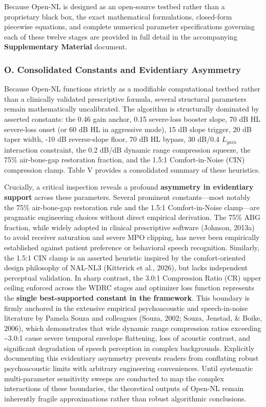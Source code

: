 \documentclass[
  12pt,
]{article}
\begin{document}
Because Open-NL is designed as an open-source testbed rather than a
proprietary black box, the exact mathematical formulations, closed-form
piecewise equations, and complete numerical parameter specifications
governing each of these twelve stages are provided in full detail in the
accompanying \textbf{Supplementary Material} document.

\subsubsection{O. Consolidated Constants and Evidentiary
Asymmetry}\label{o.-consolidated-constants-and-evidentiary-asymmetry}

Because Open-NL functions strictly as a modifiable computational testbed
rather than a clinically validated prescriptive formula, several
structural parameters remain mathematically uncalibrated. The algorithm
is structurally dominated by asserted constants: the 0.46 gain anchor,
0.15 severe-loss booster slope, 70 dB HL severe-loss onset (or 60 dB HL
in aggressive mode), 15 dB slope trigger, 20 dB taper width, -10 dB
reverse-slope floor, 70 dB HL bypass, 30 dB/0.4 \(L_{gain}\) interaction
constraint, the 0.2 dB/dB dynamic range compression squeeze, the 75\%
air-bone-gap restoration fraction, and the 1.5:1 Comfort-in-Noise (CIN)
compression clamp. Table V provides a consolidated summary of these
heuristics.

Crucially, a critical inspection reveals a profound \textbf{asymmetry in
evidentiary support} across these parameters. Several prominent
constants---most notably the 75\% air-bone-gap restoration rule and the
1.5:1 Comfort-in-Noise clamp---are pragmatic engineering choices without
direct empirical derivation. The 75\% ABG fraction, while widely adopted
in clinical prescriptive software (Johnson, 2013a) to avoid receiver
saturation and severe MPO clipping, has never been empirically
established against patient preference or behavioral speech recognition.
Similarly, the 1.5:1 CIN clamp is an asserted heuristic inspired by the
comfort-oriented design philosophy of NAL-NL3 (Kitterick et al., 2026),
but lacks independent perceptual validation. In sharp contrast, the
3.0:1 Compression Ratio (CR) upper ceiling enforced across the WDRC
stages and optimizer loss function represents the \textbf{single
best-supported constant in the framework}. This boundary is firmly
anchored in the extensive empirical psychoacoustic and speech-in-noise
literature by Pamela Souza and colleagues (Souza, 2002; Souza, Jenstad,
\& Boike, 2006), which demonstrates that wide dynamic range compression
ratios exceeding \textasciitilde3.0:1 cause severe temporal envelope
flattening, loss of acoustic contrast, and significant degradation of
speech perception in complex backgrounds. Explicitly documenting this
evidentiary asymmetry prevents readers from conflating robust
psychoacoustic limits with arbitrary engineering conveniences. Until
systematic multi-parameter sensitivity sweeps are conducted to map the
complex interactions of these boundaries, the theoretical outputs of
Open-NL remain inherently fragile approximations rather than robust
algorithmic conclusions.
\end{document}
